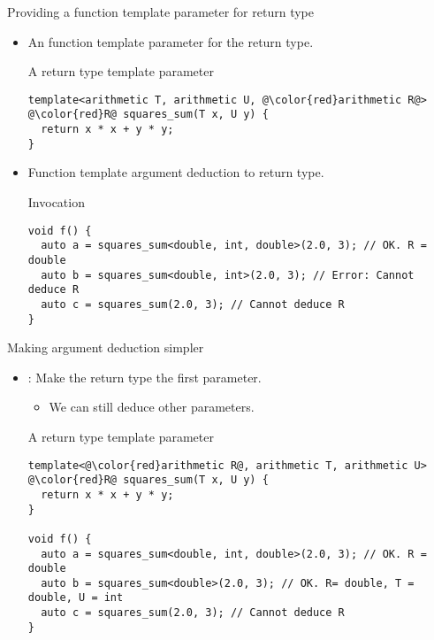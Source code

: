 \begin{frame}[t,fragile]{Providing a function template parameter for return type}

\begin{itemize}
  \item An  function template parameter  for the return type.

\begin{block}{A return type template parameter}
\begin{lstlisting}[escapechar=@]
template<arithmetic T, arithmetic U, @\color{red}arithmetic R@>
@\color{red}R@ squares_sum(T x, U y) {
  return x * x + y * y;
}
\end{lstlisting}
\end{block}

  \item Function template argument deduction  to return type.

\begin{block}{Invocation}
\begin{lstlisting}
void f() {
  auto a = squares_sum<double, int, double>(2.0, 3); // OK. R = double
  auto b = squares_sum<double, int>(2.0, 3); // Error: Cannot deduce R
  auto c = squares_sum(2.0, 3); // Cannot deduce R
}
\end{lstlisting}
\end{block}

\end{itemize}
\end{frame}

\begin{frame}[t,fragile]{Making argument deduction simpler}
\begin{itemize}
  \item {}: Make the return type the first parameter.
    \begin{itemize}
      \item We can still deduce other parameters.
    \end{itemize}
\begin{block}{A return type template parameter}
\begin{lstlisting}[escapechar=@]
template<@\color{red}arithmetic R@, arithmetic T, arithmetic U>
@\color{red}R@ squares_sum(T x, U y) {
  return x * x + y * y;
}

void f() {
  auto a = squares_sum<double, int, double>(2.0, 3); // OK. R = double
  auto b = squares_sum<double>(2.0, 3); // OK. R= double, T = double, U = int
  auto c = squares_sum(2.0, 3); // Cannot deduce R
}
\end{lstlisting}
\end{block}

\end{itemize}
\end{frame}
